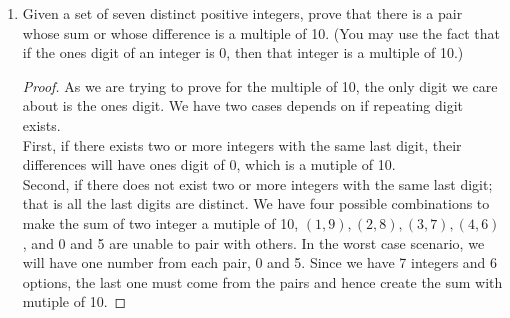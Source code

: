 \documentclass[12pt]{article}
\newcommand{\N}{\mathbb{N}}
\begin{document}
\begin{enumerate}
		\begin{proof}
				We prove this result by strong induction on $n$. Let $A$ be the set of natural numbers for wihch the above statement is true. 
				Note that the statement is true when $n=0$ because when there is no flags on the pole, there is only one way displaying it, $\displaystyle \frac{2}{3} 2^1 + \frac{1}{3} (-1)^1 = 1$.\\
				Suppose, the result is true when $n=1,2,3...k$. Let $n=k+1$, we must prove that there are $\displaystyle \frac{2}{3} 2^{n+1} + \frac{1}{3} (-1)^{n+1}$ ways to display the flags. \\
				There are three possible ways to add the last flag:
				If the last flag is red, which is 1 foot tall, there are $n$ feet left on the pole and hence $\displaystyle \frac{2}{3} 2^n + \frac{1}{3} (-1)^n \cdot 1$ ways.\\
				If the last flag is blue, which is 2 foot tall, there are $n-1$ feet left on the pole and hence $\displaystyle \frac{2}{3} 2^{n-1} + \frac{1}{3} (-1)^{n-1} \cdot 1$ ways.
				If the last flag is green, similarly, there are $\displaystyle \frac{2}{3} 2^{n-1} + \frac{1}{3} (-1)^{n-1} \cdot 1$  ways.\\
				In total, there are $\displaystyle \frac{2}{3} 2^n + \frac{1}{3} (-1)^n + 2 \cdot (\displaystyle \frac{2}{3} 2^{n-1} + \frac{1}{3} (-1)^{n-1} ) = \displaystyle \frac{2}{3} 2^{n+1} + \frac{1}{3} (-1)^{n+1} $ ways to display the flag.\\
				We have shown $0 \in A$ and $0,1,2,...,k \in A \implies (k+1) \in A$. Therefore, by strong induction, we know that $A \in \N$ and the statement is true for all natural numbers.
				
		\end{proof}

		\item Given a set of seven distinct positive integers, prove that there is a pair whose sum or whose difference is a multiple of 10. (You may use the fact that if the ones digit of an integer is 0, then that integer is a multiple of 10.)
		\begin{proof}
			As we are trying to prove for the multiple of 10, the only digit we care about is the ones digit. We have two cases depends on if repeating digit exists. \\
			First, if there exists two or more integers with the same last digit, their differences will have ones digit of 0, which is a mutiple of 10.\\
			Second, if there does not exist two or more integers with the same last digit; that is all the last digits are distinct. We have four possible combinations to make the sum of two integer a mutiple of 10, $(1,9),(2,8),(3,7),(4,6)$, and 0 and 5 are unable to pair with others. In the worst case scenario, we will have one number from each pair, 0 and 5. Since we have 7 integers and 6 options, the last one must come from the pairs and hence create the sum with mutiple of 10.
			
		\end{proof}
		
	\end{enumerate}
\end{document}
